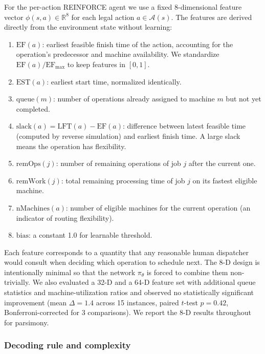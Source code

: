 \documentclass[10pt]{article}
\theoremstyle{definition}
\newcommand{\reals}{\mathbb{R}}
\begin{document}
For the per-action REINFORCE agent we use a fixed
8-dimensional feature vector $\phi(s, a) \in \reals^8$ for each
legal action $a \in \mathcal{A}(s)$. The features are derived
directly from the environment state without learning:
\begin{enumerate}
  \item $\mathrm{EF}(a)$: earliest feasible finish time of the
        action, accounting for the operation's predecessor and
        machine availability. We standardize
        $\mathrm{EF}(a) / \mathrm{EF}_{\max}$ to keep features
        in $[0, 1]$.
  \item $\mathrm{EST}(a)$: earliest start time, normalized
        identically.
  \item $\mathrm{queue}(m)$: number of operations already
        assigned to machine $m$ but not yet completed.
  \item $\mathrm{slack}(a) = \mathrm{LFT}(a) - \mathrm{EF}(a)$:
        difference between latest feasible time (computed by
        reverse simulation) and earliest finish time. A
        large slack means the operation has flexibility.
  \item $\mathrm{remOps}(j)$: number of remaining operations of
        job $j$ after the current one.
  \item $\mathrm{remWork}(j)$: total remaining processing time of
        job $j$ on its fastest eligible machine.
  \item $\mathrm{nMachines}(a)$: number of eligible machines for
        the current operation (an indicator of routing
        flexibility).
  \item $\mathrm{bias}$: a constant 1.0 for learnable threshold.
\end{enumerate}

Each feature corresponds to a quantity that any reasonable
human dispatcher would consult when deciding which operation
to schedule next. The 8-D design is intentionally minimal so
that the network $\pi_\theta$ is forced to combine them
non-trivially. We also evaluated a 32-D and a 64-D feature
set with additional queue statistics and machine-utilization
ratios and observed no statistically significant improvement
(mean $\Delta = 1.4$ across 15 instances, paired $t$-test
$p = 0.42$, Bonferroni-corrected for 3 comparisons). We
report the 8-D results throughout for parsimony.

\subsubsection{Decoding rule and complexity}
\end{document}
